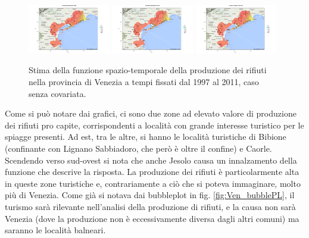 \documentclass[a4paper,11pt,twoside,openright]{book}							%
\begin{document}
\begin{figure}[H]
	\includegraphics[trim=0cm 0cm 4cm 0cm,clip=true,width=0.32\textwidth]{Immagini/venezia_senza_covariate/Maps2009.png}
	\includegraphics[trim=0cm 0cm 4cm 0cm,clip=true,width=0.32\textwidth]{Immagini/venezia_senza_covariate/Maps2010.png}
	\includegraphics[trim=0cm 0cm 4cm 0cm,clip=true,width=0.32\textwidth]{Immagini/venezia_senza_covariate/Maps2011.png}
	\caption{Stima della funzione spazio-temporale della produzione dei rifiuti nella provincia di Venezia a tempi fissati dal 1997 al 2011, caso senza covariata.}
	\label{fig:Ven_ris}
\end{figure}
\newpage
Come si può notare dai grafici, ci sono due zone ad elevato valore di produzione dei rifiuti pro capite, corrispondenti a località con grande interesse turistico per le spiagge presenti. Ad est, tra le altre, si hanno le località turistiche di Bibione (confinante con Lignano Sabbiadoro, che però è oltre il confine) e Caorle. Scendendo verso sud-ovest si nota che anche Jesolo causa un innalzamento della funzione che descrive la risposta. La produzione dei rifiuti è particolarmente alta in queste zone turistiche e, contrariamente a ciò che si poteva immaginare, molto più di Venezia. Come già si notava dai bubbleplot in fig. \ref{fig:Ven_bubblePL}, il turismo sarà rilevante nell'analisi della produzione di rifiuti, e la causa non sarà Venezia (dove la produzione non è eccessivamente diversa dagli altri comuni) ma saranno le località balneari.
\end{document}
